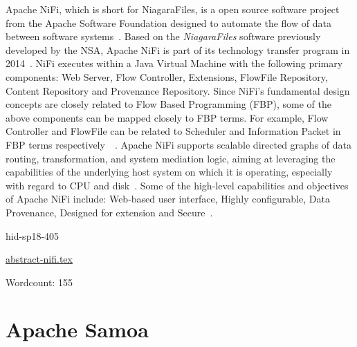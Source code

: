 Apache NiFi, which is short for NiagaraFiles, is a open source
software project from the Apache Software Foundation designed to
automate the flow of data between software
systems~\cite{hid-sp18-405-wiki-nifi}. Based on the \emph{NiagaraFiles}
software previously developed by the NSA, Apache NiFi is part of its
technology transfer program in 2014~\cite{hid-sp18-405-wiki-nifi}.
NiFi executes within a Java Virtual Machine with the following primary
components: Web Server, Flow Controller, Extensions, FlowFile
Repository, Content Repository and Provenance Repository. Since NiFi's
fundamental design concepts are closely related to Flow Based
Programming (FBP), some of the above components can be mapped closely
to FBP terms. For example, Flow Controller and FlowFile can be related
to Scheduler and Information Packet in FBP terms
respectively~\cite{hid-sp18-405-wwwoverview-nifi}~\cite{hid-sp18-405-wikifbp-nifi}.
Apache NiFi supports scalable directed graphs of data routing,
transformation, and system mediation logic, aiming at leveraging the
capabilities of the underlying host system on which it is operating,
especially with regard to CPU and
disk~\cite{hid-sp18-405-wwwoverview-nifi}. Some of the high-level
capabilities and objectives of Apache NiFi include: Web-based user
interface, Highly configurable, Data Provenance, Designed for
extension and Secure~\cite{hid-sp18-405-www-nifi}.


\begin{IU}

hid-sp18-405

\href{https://github.com/cloudmesh-community/hid-sp18-405/blob/master//technology/abstract-nifi.tex}{abstract-nifi.tex}

 

Wordcount: 155

\end{IU}

\section{Apache Samoa}


